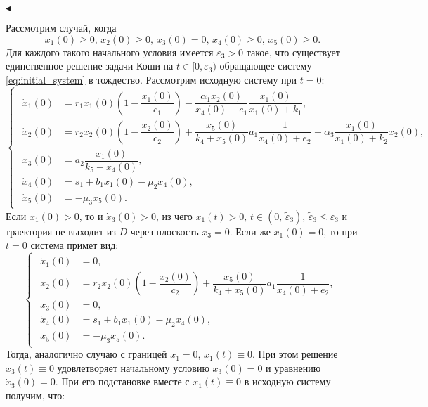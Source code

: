 \documentclass[12pt,a4paper]{extarticle}
\renewenvironment{proof}{\noindent$\blacktriangleleft$}{}
\theoremstyle{definition}
\theoremstyle{definition}
\theoremstyle{definition}
\begin{document}
\begin{proof}
		
		Рассмотрим случай, когда
		\begin{equation}\label{eq:conds_3}
			x_1(0)\ge0,\, x_2(0)\ge0,\, x_3(0)=0,\, x_4(0)\ge0,\, x_5(0)\ge0.
		\end{equation}
		Для каждого такого начального условия имеется $\varepsilon_3>0$ такое, что существует единственное решение задачи Коши на $t\in[0,\varepsilon_3)$ обращающее систему \ref{eq:initial_system} в тождество. Рассмотрим исходную систему при $t=0$:
		\begin{equation*}
			\begin{cases}
				\begin{aligned}
					\dot{x}_1(0) &= r_1x_1(0)\left(1-\dfrac{x_1(0)}{c_1}\right)-\dfrac{\alpha_1x_2(0)}{x_4(0)+e_1}\dfrac{x_1(0)}{x_1(0)+k_1},\\
					\dot{x}_2(0) &= r_2x_2(0)\left(1-\dfrac{x_2(0)}{c_2}\right)+\dfrac{x_5(0)}{k_4+x_5(0)}a_1\dfrac{1}{x_4(0)+e_2}-\alpha_3\dfrac{x_1(0)}{x_1(0)+k_2}x_2(0),\\
					\dot{x}_3(0) &= a_2\dfrac{x_1(0)}{k_5+x_4(0)},\\
					\dot{x}_4(0) &= s_1 + b_1x_1(0)-\mu_2x_4(0),\\
					\dot{x}_5(0) &= -\mu_3x_5(0).
				\end{aligned}
			\end{cases}
		\end{equation*}
		Если $x_1(0)>0$, то и $\dot{x}_3(0)>0$, из чего $x_1(t)>0,\, t\in(0,\, \tilde{\varepsilon}_3),\,\tilde{\varepsilon}_3\le\varepsilon_3$ и траектория не выходит из $D$ через плоскость $x_3=0$. Если же $x_1(0)=0$, то при $t=0$ система примет вид:
		\begin{equation*}
			\begin{cases}
				\begin{aligned}
					\dot{x}_1(0) &= 0,\\
					\dot{x}_2(0) &= r_2x_2(0)\left(1-\dfrac{x_2(0)}{c_2}\right)+\dfrac{x_5(0)}{k_4+x_5(0)}a_1\dfrac{1}{x_4(0)+e_2},\\
					\dot{x}_3(0) &= 0,\\
					\dot{x}_4(0) &= s_1 + b_1x_1(0)-\mu_2x_4(0),\\
					\dot{x}_5(0) &= -\mu_3x_5(0).
				\end{aligned}
			\end{cases}
		\end{equation*}
		Тогда, аналогично случаю с границей $x_1=0$, $x_1(t)\equiv0$. При этом решение $x_3(t)\equiv0$ удовлетворяет начальному условию $x_3(0)=0$ и уравнению $\dot{x}_3(0)=0$. При его подстановке вместе с $x_1(t)\equiv0$ в исходную систему получим, что:

\end{proof}
\end{document}
